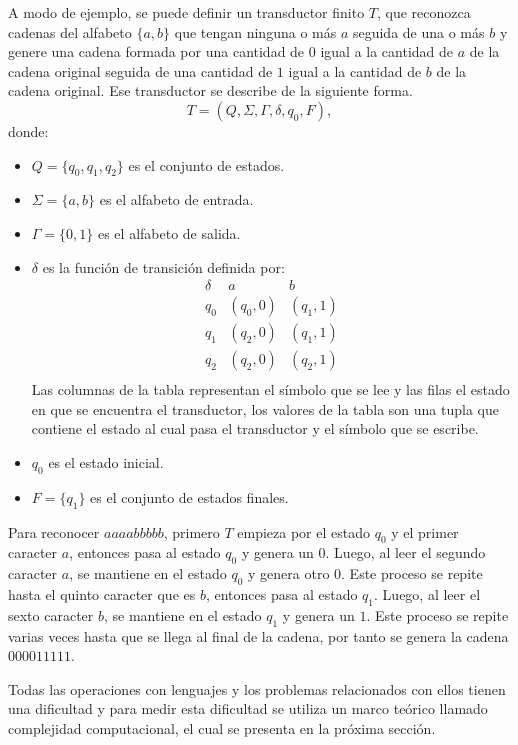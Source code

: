 \documentclass[12pt]{article}
\begin{document}
A modo de ejemplo, se puede definir un transductor finito $T$, que reconozca cadenas del alfabeto $\{a,b\}$ que tengan ninguna o más $a$ seguida de una o más $b$ y genere una cadena formada por una cantidad de $0$ igual a la cantidad de $a$ de la cadena original seguida de una cantidad de $1$ igual a la cantidad de $b$ de la cadena original. Ese transductor se describe de la siguiente forma.
\[
  T = (Q, \Sigma, \Gamma, \delta, q_0, F),
\]
donde:
\begin{itemize}
  \item \(Q = \{q_0, q_1, q_2\}\) es el conjunto de estados.
  \item \(\Sigma = \{a, b\}\) es el alfabeto de entrada.
  \item \(\Gamma = \{0, 1\}\) es el alfabeto de salida.
  \item \(\delta\) es la función de transición definida por:
        \[
          \begin{array}{c|c|c}
            \delta & a        & b        \\
            \hline
            q_0    & (q_0, 0) & (q_1, 1) \\
            q_1    & (q_2, 0) & (q_1, 1) \\
            q_2    & (q_2, 0) & (q_2, 1) \\
          \end{array}
        \]
        Las columnas de la tabla representan el símbolo que se lee y las filas el estado en que se encuentra el transductor, 
        los valores de la tabla son una tupla que contiene el estado al cual pasa el transductor y el símbolo que se escribe.
  \item \(q_0\) es el estado inicial.
  \item \(F = \{q_1\}\) es el conjunto de estados finales.
\end{itemize}

Para reconocer $aaaabbbbb$, primero $T$ empieza por el estado $q_0$ y el primer caracter $a$, entonces pasa al estado $q_0$ y genera un $0$.
Luego, al leer el segundo caracter $a$, se mantiene en el estado $q_0$ y genera otro $0$. Este proceso se repite hasta el quinto caracter
que es $b$, entonces pasa al estado $q_1$. Luego, al leer el sexto caracter $b$, se mantiene en el estado $q_1$ y genera un $1$. Este proceso
se repite varias veces hasta que se llega al final de la cadena, por tanto se genera la cadena $000011111$.

Todas las operaciones con lenguajes y los problemas relacionados con ellos tienen una dificultad y para medir esta dificultad
se utiliza un marco teórico llamado complejidad computacional, el cual se presenta en la próxima sección.
\end{document}
